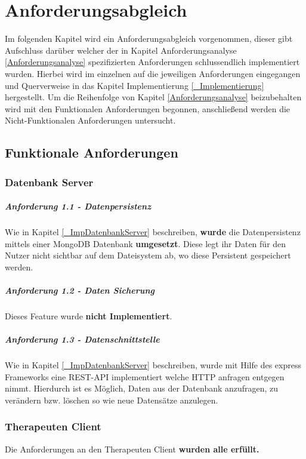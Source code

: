 \chapter{Anforderungsabgleich} \label{Anforderungsabgleich} 
Im folgenden Kapitel wird ein Anforderungsabgleich vorgenommen, dieser gibt Aufschluss darüber welcher der in Kapitel Anforderungsanalyse \ref{Anforderungsanalyse} spezifizierten Anforderungen schlussendlich implementiert wurden.
Hierbei wird im einzelnen auf die jeweiligen Anforderungen eingegangen und Querverweise in das Kapitel Implementierung \ref{_Implementierung} hergestellt. Um die Reihenfolge von Kapitel \ref{Anforderungsanalyse} beizubehalten wird mit den Funktionalen Anforderungen begonnen, anschließend werden die Nicht-Funktionalen Anforderungen untersucht.
\section{Funktionale Anforderungen}
\subsection{Datenbank Server}
\paragraph{Anforderung 1.1 - Datenpersistenz}
Wie in Kapitel \ref{_ImpDatenbankServer} beschreiben, \textbf{wurde} die Datenpersistenz mittels einer MongoDB Datenbank \textbf{umgesetzt}. Diese legt ihr Daten für den Nutzer nicht sichtbar auf dem Dateisystem ab, wo diese Persistent gespeichert werden.

\paragraph{Anforderung 1.2 - Daten Sicherung}
Dieses Feature wurde \textbf{nicht Implementiert}.

\paragraph{Anforderung 1.3 - Datenschnittstelle}
Wie in Kapitel \ref{_ImpDatenbankServer} beschreiben, wurde mit Hilfe des express Frameworks eine REST-API implementiert welche HTTP anfragen entgegen nimmt. Hierdurch ist es Möglich, Daten aus der Datenbank anzufragen, zu verändern bzw. löschen so wie neue Datensätze anzulegen.


\subsection{Therapeuten Client}
Die Anforderungen an den Therapeuten Client \textbf{wurden alle erfüllt.}
